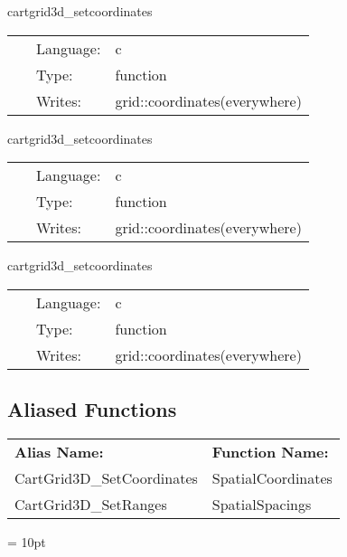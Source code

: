 \documentclass{article}
\begin{document}
\vspace{5mm}


\hspace{5mm} cartgrid3d\_setcoordinates 

\hspace{5mm}{\it set up spatial 3d cartesian coordinates on the gh } 


\hspace{5mm}

 \begin{tabular*}{160mm}{cll} 
~ & Language:  & c \\ 
~ & Type:  & function \\ 
~ & Writes:  & grid::coordinates(everywhere) \\ 
\end{tabular*} 


\vspace{5mm}


\hspace{5mm} cartgrid3d\_setcoordinates 

\hspace{5mm}{\it set coordinates after regridding } 


\hspace{5mm}

 \begin{tabular*}{160mm}{cll} 
~ & Language:  & c \\ 
~ & Type:  & function \\ 
~ & Writes:  & grid::coordinates(everywhere) \\ 
\end{tabular*} 


\vspace{5mm}


\hspace{5mm} cartgrid3d\_setcoordinates 

\hspace{5mm}{\it set coordinates after regridding } 


\hspace{5mm}

 \begin{tabular*}{160mm}{cll} 
~ & Language:  & c \\ 
~ & Type:  & function \\ 
~ & Writes:  & grid::coordinates(everywhere) \\ 
\end{tabular*} 


\subsection*{Aliased Functions}

\hspace{5mm}

 \begin{tabular*}{160mm}{ll} 

{\bf Alias Name:} ~~~~~~~ & {\bf Function Name:} \\ 
CartGrid3D\_SetCoordinates & SpatialCoordinates \\ 
CartGrid3D\_SetRanges & SpatialSpacings \\ 
\end{tabular*} 



\vspace{5mm}\parskip = 10pt 
\end{document}
